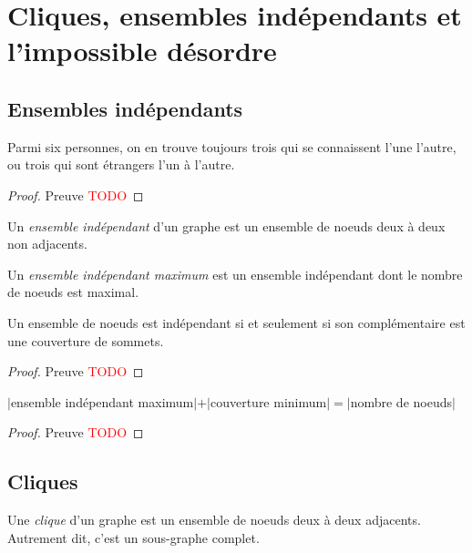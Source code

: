 \section{Cliques, ensembles indépendants et l'impossible désordre}
\subsection{Ensembles indépendants}
\begin{mytheo} 
  Parmi six personnes, on en trouve toujours trois qui se connaissent l’une l’autre, ou trois qui sont étrangers l’un à l’autre.
  \begin{proof}
     Preuve \textcolor{red}{TODO}
  \end{proof}
\end{mytheo}

\begin{mydef}
  Un \emph{ensemble indépendant} d’un graphe est un ensemble de noeuds deux à deux non adjacents.
\end{mydef}

\begin{mydef}
  Un \emph{ensemble indépendant maximum} est un ensemble indépendant dont le nombre de noeuds est maximal.
\end{mydef}

\begin{mytheo}
  Un ensemble de noeuds est indépendant si et seulement si son complémentaire est une couverture de sommets.
  \begin{proof}
     Preuve \textcolor{red}{TODO}
  \end{proof}
\end{mytheo}

\begin{mycorr}
  $|$ensemble indépendant maximum$| + |$couverture minimum$| =
|$nombre de noeuds$|$
  \begin{proof}
     Preuve \textcolor{red}{TODO}
  \end{proof}
\end{mycorr}

\subsection{Cliques}
\begin{mydef}
  Une \emph{clique} d’un graphe est un ensemble de noeuds deux à deux adjacents. Autrement dit, c’est un sous-graphe complet.
\end{mydef}

